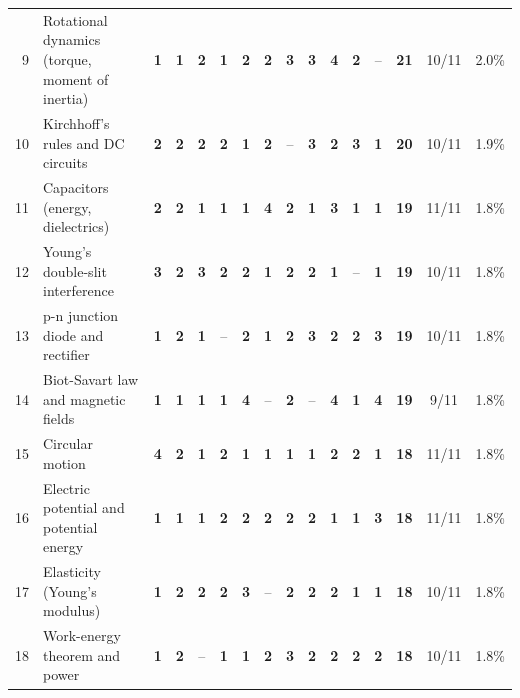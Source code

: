 \documentclass[10pt,a4paper]{article}
\begin{document}
{\begin{tabularx}{\linewidth}{@{}r>{\raggedright\arraybackslash}X*{11}{c}ccc@{}}
9 & Rotational dynamics (torque, moment of inertia) & \textbf{1} & \textbf{1} & \textbf{2} & \textbf{1} & \textbf{2} & \textbf{2} & \textbf{3} & \textbf{3} & \textbf{4} & \textbf{2} & {\color{gray!60}--} & \textbf{21} & 10/11 & 2.0\%\\
10 & Kirchhoff's rules and DC circuits & \textbf{2} & \textbf{2} & \textbf{2} & \textbf{2} & \textbf{1} & \textbf{2} & {\color{gray!60}--} & \textbf{3} & \textbf{2} & \textbf{3} & \textbf{1} & \textbf{20} & 10/11 & 1.9\%\\
11 & Capacitors (energy, dielectrics) & \textbf{2} & \textbf{2} & \textbf{1} & \textbf{1} & \textbf{1} & \textbf{4} & \textbf{2} & \textbf{1} & \textbf{3} & \textbf{1} & \textbf{1} & \textbf{19} & 11/11 & 1.8\%\\
12 & Young's double-slit interference & \textbf{3} & \textbf{2} & \textbf{3} & \textbf{2} & \textbf{2} & \textbf{1} & \textbf{2} & \textbf{2} & \textbf{1} & {\color{gray!60}--} & \textbf{1} & \textbf{19} & 10/11 & 1.8\%\\
13 & p-n junction diode and rectifier & \textbf{1} & \textbf{2} & \textbf{1} & {\color{gray!60}--} & \textbf{2} & \textbf{1} & \textbf{2} & \textbf{3} & \textbf{2} & \textbf{2} & \textbf{3} & \textbf{19} & 10/11 & 1.8\%\\
14 & Biot-Savart law and magnetic fields & \textbf{1} & \textbf{1} & \textbf{1} & \textbf{1} & \textbf{4} & {\color{gray!60}--} & \textbf{2} & {\color{gray!60}--} & \textbf{4} & \textbf{1} & \textbf{4} & \textbf{19} & 9/11 & 1.8\%\\
15 & Circular motion & \textbf{4} & \textbf{2} & \textbf{1} & \textbf{2} & \textbf{1} & \textbf{1} & \textbf{1} & \textbf{1} & \textbf{2} & \textbf{2} & \textbf{1} & \textbf{18} & 11/11 & 1.8\%\\
16 & Electric potential and potential energy & \textbf{1} & \textbf{1} & \textbf{1} & \textbf{2} & \textbf{2} & \textbf{2} & \textbf{2} & \textbf{2} & \textbf{1} & \textbf{1} & \textbf{3} & \textbf{18} & 11/11 & 1.8\%\\
17 & Elasticity (Young's modulus) & \textbf{1} & \textbf{2} & \textbf{2} & \textbf{2} & \textbf{3} & {\color{gray!60}--} & \textbf{2} & \textbf{2} & \textbf{2} & \textbf{1} & \textbf{1} & \textbf{18} & 10/11 & 1.8\%\\
18 & Work-energy theorem and power & \textbf{1} & \textbf{2} & {\color{gray!60}--} & \textbf{1} & \textbf{1} & \textbf{2} & \textbf{3} & \textbf{2} & \textbf{2} & \textbf{2} & \textbf{2} & \textbf{18} & 10/11 & 1.8\%\\

\end{tabularx}}
\end{document}
